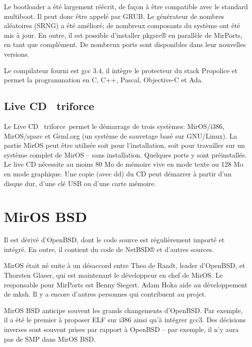 \documentclass[a4paper,landscape,11pt,notumble]{leaflet}
\begin{document}
Le bootloader a été largement réécrit, de façon à être compatible avec le standard multiboot. Il peut donc être appelé par GRUB. Le générateur de nombres aléatoires (SRNG) a été amélioré; de nombreux composants du système ont été mis à jour. En outre, il est possible d’installer pkgsrc® en parallèle de MirPorts, en tant que complément. De nombreux ports sont disponibles dans leur nouvelles versions.

Le compilateur fourni est gcc 3.4, il intègre le protecteur du stack Propolice et permet la programmation en C, C++, Pascal, Objective-C et Ada.

\subsection{Live CD \flqq~triforce~\frqq}

Le Live CD \flqq~triforce~\frqq permet le démarrage de trois systèmes: MirOS/i386, MirOS/sparc et Grml.org (un système de sauvetage basé sur GNU/Linux). La partie MirOS peut être utilisée soit pour l’installation, soit pour travailler sur un système complet de MirOS – sans installation. Quelques ports y sont préinstallés. Le live CD nécessite au moins 80 Mo de mémoire vive en mode texte ou 128 Mo en mode graphique. Une copie (avec dd) du CD peut démarrer à partir d’un disque dur, d’une clé USB ou d’une carte mémoire.

\newpage

\section{MirOS BSD}


Il est dérivé d’OpenBSD, dont le code source est régulièrement importé et intégré. En outre, il contient du code de NetBSD® et d’autres sources.

MirOS était né suite à un désaccord entre Theo de Raadt, leader d’OpenBSD, et Thorsten Glaser, qui est maintenant le développeur en chef de MirOS. Le responsable pour MirPorts est Benny Siegert. Adam Hoka aide au développement de mksh. Il y a encore d’autres personnes qui contribuent au projet.

MirOS BSD anticipe souvent les grands changements d’OpenBSD. Par exemple, il a été le premier à proposer ELF sur i386 ainsi qu’à intégrer gcc3. Des décisions inverses sont souvent prises par rapport à OpenBSD – par exemple, il n’y aura pas de SMP dans MirOS BSD.
\end{document}
